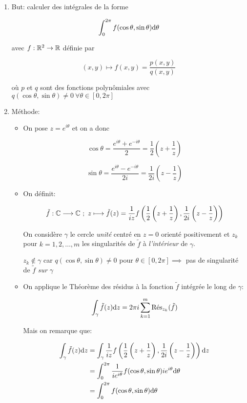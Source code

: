 \begin{enumerate}[label=\alph*)]
    \item But: calculer des intégrales de la forme
    
    \[ \int_0^{2\pi} f(\cos \theta, \sin \theta) \dth \]
    
    avec $f: \R^2 \rightarrow \R$ définie par
    
    \[ (x,y) \longmapsto f(x,y) = \frac{p(x,y)}{q(x,y)} \]
    
    où $p$ et $q$ sont des fonctions polynômiales avec $q(\cos \theta, \sin \theta) \neq 0 \ \forall \theta \in [0, 2\pi]$
    
    \item Méthode:
    
    \begin{itemize}
    \item 
    On pose $z = e^{i\theta}$ et on a donc
    
    \[ \cos \theta = \frac{e^{i\theta} + e^{-i\theta}}{2}
    = \frac{1}{2} \left(z + \frac{1}{z}\right) \]
    
    \[ \sin \theta = \frac{e^{i\theta} - e^{-i\theta}}{2i}
    = \frac{1}{2i} \left(z - \frac{1}{z}\right) \]
    
    \item 
    On définit:
    
    \[ \tilde{f}: \Cx \longrightarrow \Cx \ ; \ z \longmapsto \tilde{f}(z) = \frac{1}{iz} f\left(\frac{1}{2} \left(z + \frac{1}{z}\right), \frac{1}{2i} \left(z - \frac{1}{z}\right)\right) \]
    
    On considère $\gamma$ le cercle \textit{unité} centré en $z = 0$ orienté positivement et $z_k$ pour $k = 1, 2, \ldots, m$ les singularités de $\tilde{f}$ à \textit{l'intérieur} de $\gamma$.
    
    $z_k \notin \gamma$ car $q(\cos \theta, \sin \theta) \neq 0$ pour $\theta \in [0, 2\pi] \implies$ pas de singularité de $\tilde{f}$ \textit{sur} $\gamma$
    
    \item 
    On applique le Théorème des résidus à la fonction $ \tilde{f}$ intégrée le long de $\gamma$:
    
    \[ \int_\gamma \tilde{f}(z) \dz = 2\pi i \sum_{k = 1}^m \Res_{z_k} (\tilde{f}) \]
    
    Mais on remarque que:
    
    \begin{align*}
    \int_\gamma \tilde{f}(z) \dz &= \int_\gamma \frac{1}{iz} f\left(\frac{1}{2} \left(z + \frac{1}{z}\right), \frac{1}{2i} \left(z - \frac{1}{z}\right)\right) \dz
    \\&= \int_0^{2\pi} \frac{1}{ie^{i\theta}} f(\cos \theta, \sin \theta) i e^{i\theta} \dth
    \\&= \int_0^{2\pi} f(\cos \theta, \sin \theta) \dth
    \end{align*}
    

\end{itemize}
\end{enumerate}
